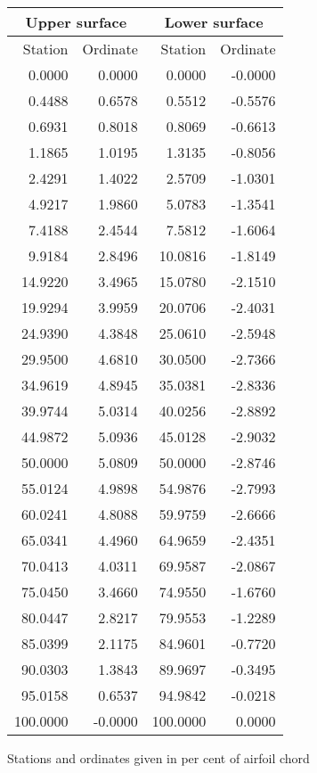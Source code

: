 \documentclass[11pt]{book}
\begin{document}
 \hspace{4mm}
 \begin{tabular}{|r|r|r|r|} \hline 
 \multicolumn{2}{|c|}{Upper surface} & \multicolumn{2}{|c|}{Lower surface} \\
 \hline
 Station & Ordinate & Station & Ordinate \\
 \hline
0.0000 & 0.0000 & 0.0000 & -0.0000 \\
0.4488 & 0.6578 & 0.5512 & -0.5576 \\
0.6931 & 0.8018 & 0.8069 & -0.6613 \\
1.1865 & 1.0195 & 1.3135 & -0.8056 \\
2.4291 & 1.4022 & 2.5709 & -1.0301 \\
4.9217 & 1.9860 & 5.0783 & -1.3541 \\
7.4188 & 2.4544 & 7.5812 & -1.6064 \\
9.9184 & 2.8496 & 10.0816 & -1.8149 \\
14.9220 & 3.4965 & 15.0780 & -2.1510 \\
19.9294 & 3.9959 & 20.0706 & -2.4031 \\
24.9390 & 4.3848 & 25.0610 & -2.5948 \\
29.9500 & 4.6810 & 30.0500 & -2.7366 \\
34.9619 & 4.8945 & 35.0381 & -2.8336 \\
39.9744 & 5.0314 & 40.0256 & -2.8892 \\
44.9872 & 5.0936 & 45.0128 & -2.9032 \\
50.0000 & 5.0809 & 50.0000 & -2.8746 \\
55.0124 & 4.9898 & 54.9876 & -2.7993 \\
60.0241 & 4.8088 & 59.9759 & -2.6666 \\
65.0341 & 4.4960 & 64.9659 & -2.4351 \\
70.0413 & 4.0311 & 69.9587 & -2.0867 \\
75.0450 & 3.4660 & 74.9550 & -1.6760 \\
80.0447 & 2.8217 & 79.9553 & -1.2289 \\
85.0399 & 2.1175 & 84.9601 & -0.7720 \\
90.0303 & 1.3843 & 89.9697 & -0.3495 \\
95.0158 & 0.6537 & 94.9842 & -0.0218 \\
100.0000 & -0.0000 & 100.0000 & 0.0000 \\
 \hline 
 \end{tabular}
 \vspace{8mm}

Stations and ordinates given in per cent of airfoil chord
\end{document}
